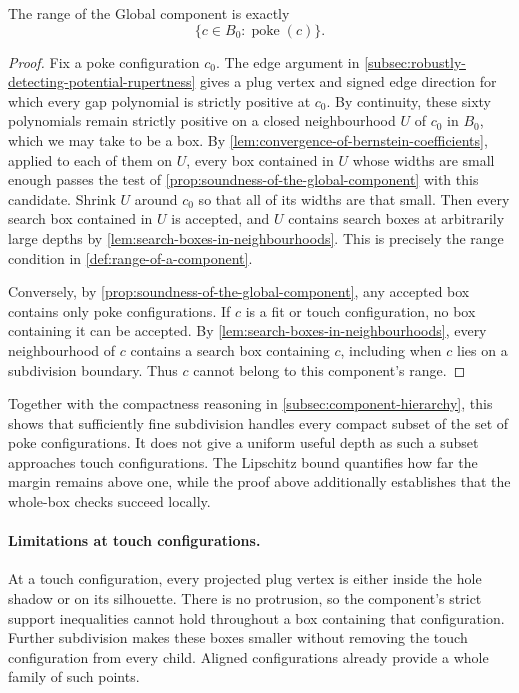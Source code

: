 \begin{proposition}\label{prop:range-of-the-global-component}
  The range of the Global component is exactly
  \[
    \{c\in B_0:\operatorname{poke}(c)\}.
  \]
\end{proposition}
\begin{proof}
  Fix a poke configuration $c_0$. The edge argument in
  \cref{subsec:robustly-detecting-potential-rupertness} gives a
  plug vertex and signed edge direction for which every gap polynomial
  is strictly positive at $c_0$. By continuity, these sixty polynomials
  remain strictly positive on a closed neighbourhood $U$ of $c_0$ in $B_0$,
  which we may take to be a box. By
  \cref{lem:convergence-of-bernstein-coefficients}, applied to each of them
  on $U$, every box contained in $U$ whose widths are small enough passes
  the test of \cref{prop:soundness-of-the-global-component} with this
  candidate. Shrink $U$ around $c_0$ so that all of its widths are that
  small. Then every search box contained in $U$ is accepted, and $U$
  contains search boxes at arbitrarily large depths by
  \cref{lem:search-boxes-in-neighbourhoods}. This is precisely the range
  condition in \cref{def:range-of-a-component}.

  Conversely, by \cref{prop:soundness-of-the-global-component}, any accepted
  box contains only poke configurations. If $c$ is a fit or touch configuration, no box
  containing it can be accepted. By \cref{lem:search-boxes-in-neighbourhoods},
  every neighbourhood of $c$ contains a search box containing $c$, including
  when $c$ lies on a subdivision boundary. Thus $c$ cannot belong to this
  component's range.
\end{proof}

Together with the compactness reasoning in
\cref{subsec:component-hierarchy}, this shows that sufficiently fine
subdivision handles every compact subset of the set of poke configurations. It does not give
a uniform useful depth as such a subset approaches touch configurations. The Lipschitz
bound quantifies how far the margin remains above one, while the proof above
additionally establishes that the whole-box checks succeed locally.

\paragraph{Limitations at touch configurations.}
At a touch configuration, every projected plug vertex is either inside the
hole shadow or on its silhouette. There is no protrusion, so the component's
strict support inequalities cannot hold throughout a box
containing that configuration. Further subdivision makes these boxes smaller
without removing the touch configuration from every child. Aligned
configurations already provide a whole family of such points.

